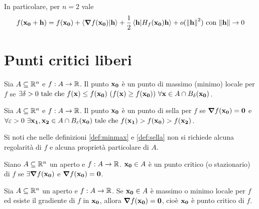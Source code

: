 \begin{remark}
    In particolare, per $n=2$ vale
    \begin{equation*}
        f(\vb{x_0} + \vb{h}) = f(\vb{x_0})+\innerproduct{\grad f(\vb{x_0})}{\vb{h}} + \frac{1}{2}\innerproduct{\vb{h}}{H_f(\vb{x_0})\vb{h}}+o(\norm{\vb{h}}^2) \with \norm{\vb{h}} \to 0
    \end{equation*}
\end{remark}

\section{Punti critici liberi}

\begin{definition}
    \label{def:minmax}
    Sia $A \subseteq \mathbb{R}^n$ e $f: A \to \mathbb{R}$. Il punto $\vb{x_0}$ è un punto di massimo (minimo) locale per $f$ se $\exists \delta > 0 \text{ tale che } f(\vb{x}) \leq f(\vb{x_0})\ (f(\vb{x})\geq f(\vb{x_0})) \ \forall \vb{x} \in A \cap B_\delta (\vb{x_0})$.
\end{definition}

\begin{definition}
    \label{def:sella}
    Sia $A \subseteq \mathbb{R}^n$ e $f: A \to \mathbb{R}$. Il punto $\vb{x_0}$ è un punto di sella per $f$ se $\grad f(\vb{x_0})=\vb{0}$ e $\forall \varepsilon > 0 \ \exists \vb{x_1}, \vb{x_2} \in A \cap B_\varepsilon(\vb{x_0}) \text{ tale che } f(\vb{x_1}) > f(\vb{x_0}) > f(\vb{x_2})$.
\end{definition}

\begin{remark}
    Si noti che nelle definizioni \ref{def:minmax} e \ref{def:sella} non si richiede alcuna regolarità di $f$ e alcuna proprietà particolare di $A$.
\end{remark}

\begin{definition}
    Siano $A \subseteq \mathbb{R}^n$ un aperto e $f: A\to \mathbb{R}$. $\vb{x_0} \in A$ è un punto critico (o stazionario) di $f$ se $\exists \grad f(\vb{x_0})$ e $\grad f(\vb{x_0})=\vb{0}$.
\end{definition}

\begin{theorem}
    [di Fermat]
    Sia $A \subseteq \mathbb{R}^n$ un aperto e $f: A \to \mathbb{R}$. Se $\vb{x_0} \in A$ è massimo o minimo locale per $f$ ed esiste il gradiente di $f$ in $\vb{x_0}$, allora $\grad f(\vb{x_0})=\vb{0}$, cioè $\vb{x_0}$ è punto critico di $f$.
\end{theorem}


